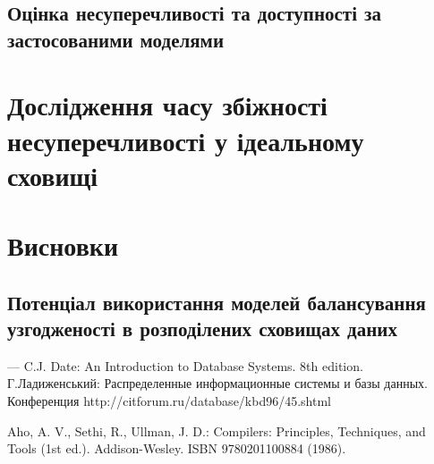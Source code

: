 \documentclass[14pt]{vakthesis}
\begin{document}
\section{Оцінка несуперечливості та доступності за застосованими моделями}


\chapter{Дослідження часу збіжності несуперечливості у ідеальному сховищі}

\chapter{Висновки}
\section{Потенціал використання моделей балансування узгодженості в розподілених сховищах даних}

\begin{thebibliography}{99}
 — 
C.J. Date: 
An Introduction to Database Systems. 8th edition.
%
Г.Ладиженський:
Распределенные информационные системы и базы данных.
Конференция
http://citforum.ru/database/kbd96/45.shtml

Aho, A. V., Sethi, R., Ullman, J. D.: 
Compilers: Principles, Techniques, and Tools (1st ed.). 
Addison-Wesley. ISBN 9780201100884 
(1986).
%


\end{thebibliography}
\end{document}
